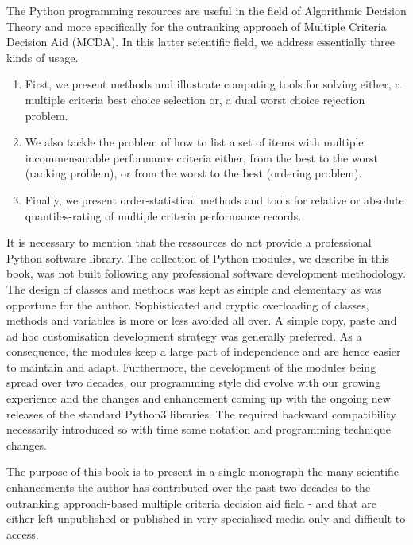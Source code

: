 The \Digraph Python programming resources are useful in the field of Algorithmic Decision Theory and more specifically for the outranking approach of Multiple Criteria Decision Aid (MCDA). In this latter scientific field, we address essentially three kinds of usage.
\begin{enumerate}[topsep=3pt,partopsep=0pt]
\item First, we present methods and illustrate computing tools for solving either, a multiple criteria best choice selection or, a dual worst choice rejection problem. 
\item We also tackle the problem of how to list a set of items with multiple incommensurable performance criteria either, from the best to the worst (ranking problem), or from the worst to the best (ordering problem).
\item Finally, we present order-statistical methods and tools for relative or absolute quantiles-rating of multiple criteria performance records.
\end{enumerate}

It is necessary to mention that the \Digraph ressources do not provide a professional Python software library. The collection of Python modules, we describe in this book, was not built following any professional software development methodology. The design of classes and methods was kept as simple and elementary as was opportune for the author. Sophisticated and cryptic overloading of classes, methods and variables is more or less avoided all over. A simple copy, paste and ad hoc customisation development strategy was generally preferred. As a consequence, the \Digraph modules keep a large part of independence and are hence easier to maintain and adapt.  Furthermore, the development of the \Digraph modules being spread over two decades, our programming style did evolve with our growing experience and the changes and enhancement coming up with the ongoing new releases of the standard Python3 libraries. The required backward compatibility necessarily introduced so with time some notation and programming technique changes.


The purpose of this book is to present in a single monograph the many scientific enhancements the author has contributed over the past two decades to the outranking approach-based multiple criteria decision aid field - and that are either left unpublished or published in very specialised media only and difficult to access.  


